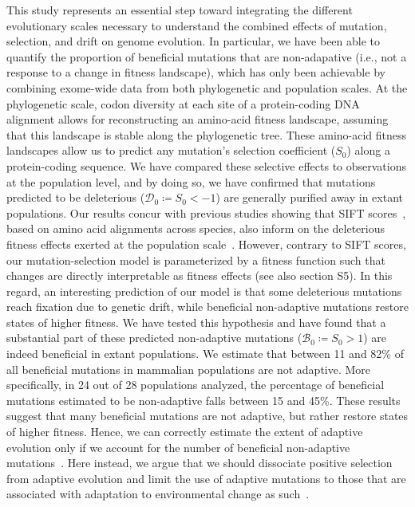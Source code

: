 \documentclass{article}
\newcommand{\Sphy}{S_{0}}
\newcommand{\SphyDel}{\mathcal{D}_0}
\newcommand{\SphyBen}{\mathcal{B}_0}
\begin{document}
    This study represents an essential step toward integrating the different evolutionary scales necessary to understand the combined effects of mutation, selection, and drift on genome evolution.
    In particular, we have been able to quantify the proportion of beneficial mutations that are non-adapative (i.e., not a response to a change in fitness landscape), which has only been achievable by combining exome-wide data from both phylogenetic and population scales.
    At the phylogenetic scale, codon diversity at each site of a protein-coding DNA alignment allows for reconstructing an amino-acid fitness landscape, assuming that this landscape is stable along the phylogenetic tree.
    These amino-acid fitness landscapes allow us to predict any mutation’s selection coefficient ($\Sphy$) along a protein-coding sequence.
    We have compared these selective effects to observations at the population level, and by doing so, we have confirmed that mutations predicted to be deleterious ($\SphyDel \coloneqq \Sphy < -1$) are generally purified away in extant populations.
    Our results concur with previous studies showing that SIFT scores~\cite{ng_sift_2003, vaser_sift_2016}, based on amino acid alignments across species, also inform on the deleterious fitness effects exerted at the population scale~\cite{chen_hunting_2021}.
    However, contrary to SIFT scores, our mutation-selection model is parameterized by a fitness function such that changes are directly interpretable as fitness effects (see also section S5).
    In this regard, an interesting prediction of our model is that some deleterious mutations reach fixation due to genetic drift, while beneficial non-adaptive mutations restore states of higher fitness.
    We have tested this hypothesis and have found that a substantial part of these predicted non-adaptive mutations ($\SphyBen \coloneqq \Sphy > 1 $) are indeed beneficial in extant populations.
    We estimate that between 11 and 82\% of all beneficial mutations in mammalian populations are not adaptive.
    More specifically, in 24 out of 28 populations analyzed, the percentage of beneficial mutations estimated to be non-adaptive falls between 15 and 45\%.
    These results suggest that many beneficial mutations are not adaptive, but rather restore states of higher fitness.
    Hence, we can correctly estimate the extent of adaptive evolution only if we account for the number of beneficial non-adaptive mutations~\cite{keightley_what_2010, rice_evolutionarily_2015}.
    Here instead, we argue that we should dissociate positive selection from adaptive evolution and limit the use of adaptive mutations to those that are associated with adaptation to environmental change as such~\cite{charlesworth_other_2007, mustonen_fitness_2009, mustonen_fitness_2010}.
\end{document}
